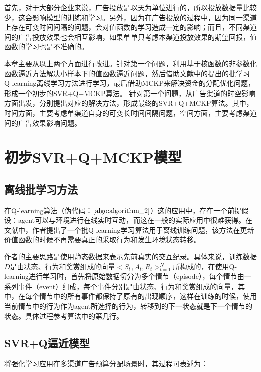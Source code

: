 
首先，对于大部分企业来说，广告投放是以天为单位进行的，所以投放数据量比较少，这会影响模型的训练和学习。另外，因为在广告投放的过程中，因为同一渠道上存在可变时间间隔的问题，会对值函数的学习造成一定的影响；而且，不同渠道间的广告投放效果也会相互影响，如果单单只考虑本渠道投放效果的期望回报，值函数的学习也是不准确的。

本章主要从以上两个方面进行改进。针对第一个问题，利用基于核函数的非参数化函数逼近方法解决小样本下的值函数逼近问题，然后借助文献\citep{pednault2002sequential}中的提出的批学习Q-learning离线学习方法进行学习，最后借助MCKP来解决资金的分配优化问题，形成一个初步的SVR+Q+MCKP算法。
针对第一个问题，从广告渠道的时空影响方面出发，分别提出对应的解决方法，形成最终的SVR+Q+MCKP算法。其中，时间方面，主要考虑单渠道自身的可变长时间间隔问题，空间方面，主要考虑渠道间的广告效果影响问题。

\section{初步SVR+Q+MCKP模型}
\subsection{离线批学习方法}
在Q-learning算法（伪代码：$\ref{algo:algorithm_2}$）这的应用中，存在一个前提假设：agent可以与环境进行在线实时互动，而这在一般的实际应用中很难获得。在文献\citep{pednault2002sequential}中，作者提出了一个批Q-learning学习算法用于离线训练问题，该方法在更新价值函数的时候不再需要真正的采取行为和发生环境状态转移。

作者的主要思路是使用静态数据来表示先前真实的交互纪录。具体来说，训练数据$D$是由状态、行为和奖赏组成的向量$<S_{t},A_{t},R_{t}>_{t=1}^{N}$所构成的，在使用Q-learning进行学习时，首先将原始数据切分为多个情节（episode），每个情节由一系列事件（event）组成，每个事件分别是由状态、行为和奖赏组成的向量，其中，在每个情节中的所有事件都保持了原有的出现顺序，这样在训练的时候，使用当前情节中的行为作为agent所选择的行为，转移到的下一状态就是下一个情节的状态。具体过程参考算法中的第几行。

\subsection{SVR+Q逼近模型}
将强化学习应用在多渠道广告预算分配场景时，其过程可表述为：

